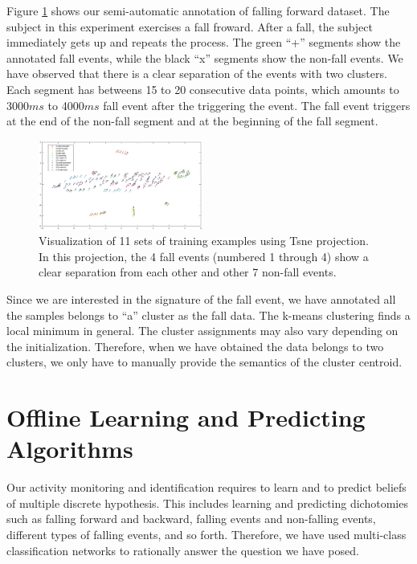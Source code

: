 \documentclass{IEEEtran}
\begin{document}
Figure \ref{fig:automatic_annotation} shows our semi-automatic annotation of falling 
forward dataset. The subject in this experiment exercises a fall froward. After a 
fall, the subject immediately gets up and repeats the process. The green ``+'' segments 
show the annotated fall events, while the black ``x'' segments show the non-fall 
events. We have observed that there is a clear separation of the events with two 
clusters. Each segment has betweens 15 to 20 consecutive data points, which amounts to 
3000$ms$ to 4000$ms$ fall event after the triggering the event. The fall event triggers 
at the end of the non-fall segment and at the beginning of the fall segment.

\begin{figure}[!htb]
\centering
\includegraphics[width=0.48\textwidth]{figures/viz_all_training_examples_corp.eps} 
\caption{Visualization of 11 sets of training examples using Tsne projection. In this projection, the 4 fall events (numbered 1 through 4) show a clear separation from each other and other 7 non-fall events.}
 \label{fig:automatic_annotation} 
\end{figure}


Since we are 
interested in the signature of the fall event, we have annotated all the samples belongs 
to ``a'' cluster as the fall data. The k-means clustering finds a 
local minimum in general. The cluster assignments may also vary depending on the 
initialization. Therefore, when we have obtained the data belongs to two clusters, we 
only have to manually provide the semantics of the cluster centroid. 

\section{Offline Learning and Predicting Algorithms}
\label{OffLineLearning}


Our activity monitoring and identification requires to learn and to predict beliefs of 
multiple 
discrete hypothesis. This includes learning and predicting dichotomies such as falling 
forward and 
backward, falling events and non-falling events, different types of falling events, and 
so forth. 
Therefore, 
we have used multi-class classification networks to rationally answer the question we 
have posed.
\end{document}
